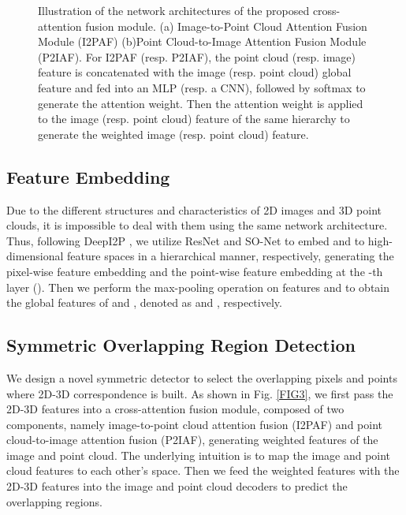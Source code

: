 \documentclass[lettersize,journal]{IEEEtran}
\begin{document}
\begin{figure*}
\centering
{}
\caption{Illustration of the network architectures of the proposed cross-attention fusion module. (a) Image-to-Point Cloud Attention Fusion Module (I2PAF) (b)Point Cloud-to-Image Attention Fusion Module (P2IAF). For I2PAF (resp. P2IAF), the point cloud (resp. image) feature is concatenated with the image (resp. point cloud) global feature and fed into an MLP (resp. a CNN), followed by softmax to generate the attention weight. Then the attention weight is applied to the image (resp. point cloud) feature of the same hierarchy to generate the weighted image (resp. point cloud) feature.} 

\label{FIG4}
\end{figure*}


\subsection{Feature Embedding}
Due to the different structures and characteristics of 2D images and 3D point clouds, it is impossible to deal with them using the same network architecture. Thus, following DeepI2P \cite{DEEPI2P}, we utilize ResNet \cite{RESNet} and SO-Net \cite{SONET} to embed  and  to high-dimensional feature spaces in a hierarchical manner, respectively, generating the pixel-wise feature embedding   and the point-wise feature embedding  at the -th layer (). Then we perform the max-pooling operation on features  and  to obtain the global features of  and , denoted as  and , respectively.

\subsection{Symmetric Overlapping Region Detection}
We design a novel symmetric detector to select the overlapping pixels and points where 2D-3D correspondence is built. As shown in Fig. \ref{FIG3}, we first pass the 2D-3D features into a cross-attention fusion module, composed of two components, namely image-to-point cloud attention fusion (I2PAF) and point cloud-to-image attention fusion (P2IAF), generating weighted features of the image and point cloud. The underlying intuition is to map the image and point cloud features to each other's space. Then we feed the weighted features with the 2D-3D features into the image and point cloud decoders to predict the overlapping regions. 
\\
\end{document}
